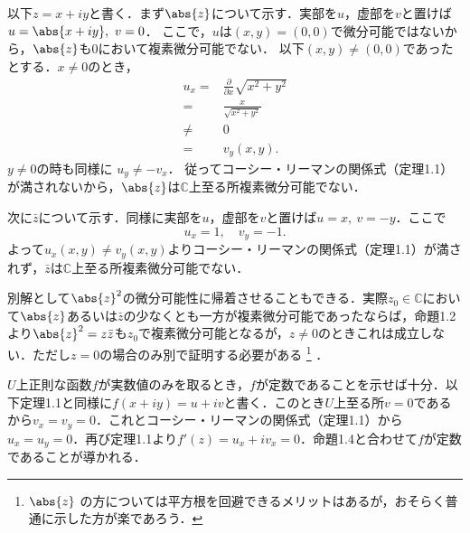 \begin{tproof}
    以下$z = x + iy$と書く．まず$\abs{z}$について示す．実部を$u$，虚部を$v$と置けば$u = \abs{x + iy},\ v = 0$．
    ここで，$u$は$(x, y) = (0, 0)$で微分可能ではないから，$\abs{z}$も$0$において複素微分可能でない．
    以下$(x, y) \neq (0, 0)$であったとする．$x \neq 0$のとき，
    \begin{align*}
        u_x ={} & \frac{\partial}{\partial x}\sqrt{x^2 + y^2} \\
        ={}     & \frac{x}{\sqrt{x^2 + y^2}}                  \\
        \neq{}  & 0                                           \\
        ={}     & v_y(x, y).
    \end{align*}
    $y \neq 0$の時も同様に $u_y \neq -v_x$．
    従ってコーシー・リーマンの関係式（定理1.1）が満されないから，$\abs{z}$は$\mathbb{C}$上至る所複素微分可能でない．

    次に$\bar{z}$について示す．同様に実部を$u$，虚部を$v$と置けば$u = x,\ v = -y$．ここで
    \[
        u_x = 1,\quad v_y = -1.
    \]
    よって$u_x(x, y) \neq v_y(x, y)$よりコーシー・リーマンの関係式（定理1.1）が満されず，$\bar{z}$は$\mathbb{C}$上至る所複素微分可能でない．
\end{tproof}

別解として$\abs{z}^2$の微分可能性に帰着させることもできる．実際$z_0 \in \mathbb{C}$において$\abs{z}$あるいは$\bar{z}$の少なくとも一方が複素微分可能であったならば，命題1.2より$\abs{z}^2 = z\bar{z}$も$z_0$で複素微分可能となるが，$z \neq 0$のときこれは成立しない．ただし$z = 0$の場合のみ別で証明する必要がある%
\footnote{$\abs{z}$ の方については平方根を回避できるメリットはあるが，おそらく普通に示した方が楽であろう．}%
．


\begin{tproof}
    $U$上正則な函数$f$が実数値のみを取るとき，$f$が定数であることを示せば十分．以下定理1.1と同様に$f(x + iy) = u + iv$と書く．このとき$U$上至る所$v = 0$であるから$v_x = v_y = 0$．これとコーシー・リーマンの関係式（定理1.1）から$u_x = u_y = 0$．再び定理1.1より$f'(z) = u_x + iv_x = 0$．命題1.4と合わせて$f$が定数であることが導かれる．
\end{tproof}


